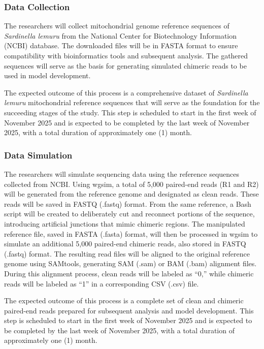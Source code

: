  \subsubsection{Data Collection} 
The researchers will collect mitochondrial genome reference sequences of \textit{Sardinella lemuru} from the National Center for Biotechnology Information (NCBI) database. The downloaded files will be in FASTA format to ensure compatibility with bioinformatics tools and subsequent analysis. The gathered sequences will serve as the basis for generating simulated chimeric reads to be used in model development.

The expected outcome of this process is a comprehensive dataset of \textit{Sardinella lemuru} mitochondrial reference sequences that will serve as the foundation for the succeeding stages of the study. This step is scheduled to start in the first week of November 2025 and is expected to be completed by the last week of November 2025, with a total duration of approximately one (1) month.

 \subsubsection{Data Simulation} 
 The researchers will simulate sequencing data using the reference sequences collected from NCBI. Using wgsim, a total of 5,000 paired-end reads (R1 and R2) will be generated from the reference genome and designated as clean reads. These reads will be saved in FASTQ (.fastq) format. From the same reference, a Bash script will be created to deliberately cut and reconnect portions of the sequence, introducing artificial junctions that mimic chimeric regions. The manipulated reference file, saved in FASTA (.fasta) format, will then be processed in wgsim to simulate an additional 5,000 paired-end chimeric reads, also stored in FASTQ (.fastq) format. The resulting read files will be aligned to the original reference genome using SAMtools, generating SAM (.sam) or BAM (.bam) alignment files. During this alignment process, clean reads will be labeled as “0,” while chimeric reads will be labeled as “1” in a corresponding CSV (.csv) file.

 The expected outcome of this process is a complete set of clean and chimeric paired-end reads prepared for subsequent analysis and model development. This step is scheduled to start in the first week of November 2025 and is expected to be completed by the last week of November 2025, with a total duration of approximately one (1) month.

